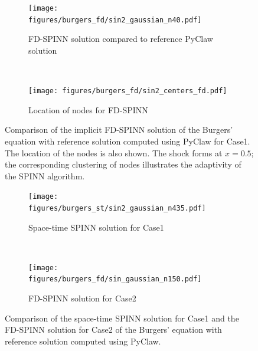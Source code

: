 \documentclass[12pt]{article}
\begin{document}
\begin{figure}
\begin{subfigure}{0.5\textwidth}
\texttt{[image: figures/burgers\_fd/sin2\_gaussian\_n40.pdf]}
\caption{FD-SPINN solution compared to reference PyClaw solution}
\label{fig:burgers_comp}
\end{subfigure}
~
\begin{subfigure}{0.5\textwidth}
\texttt{[image: figures/burgers\_fd/sin2\_centers\_fd.pdf]}
\caption{Location of nodes for FD-SPINN}
\label{fig:burgers_nodes}
\end{subfigure}
\caption{Comparison of the implicit FD-SPINN solution of the Burgers' equation with reference solution computed using PyClaw for Case1. The location of the nodes is also shown. The shock forms at $x=0.5$; the corresponding clustering of nodes illustrates the adaptivity of the SPINN algorithm.}
\label{fig:inviscid_burgers}
\end{figure}

\begin{figure}
\begin{subfigure}{0.5\textwidth}
\texttt{[image: figures/burgers\_st/sin2\_gaussian\_n435.pdf]}
\caption{Space-time SPINN solution for Case1}
\label{fig:burgers_st_case1}
\end{subfigure}
~
\begin{subfigure}{0.5\textwidth}
\texttt{[image: figures/burgers\_fd/sin\_gaussian\_n150.pdf]}
\caption{FD-SPINN solution for Case2}
\label{fig:burgers_fd_case2}
\end{subfigure}
\caption{Comparison of the space-time SPINN solution for Case1 and the FD-SPINN solution for Case2 of the Burgers' equation with reference solution computed using PyClaw.}
\label{fig:inviscid_burgers_mix}
\end{figure}
\end{document}
